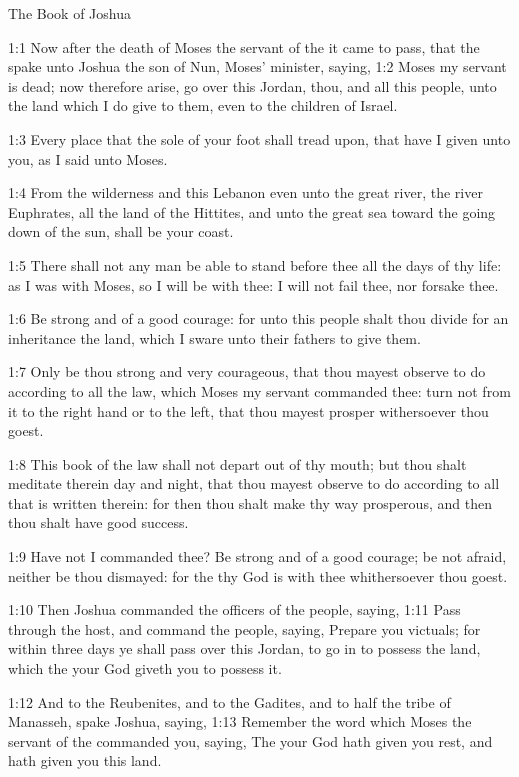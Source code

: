 The Book of Joshua


1:1 Now after the death of Moses the servant of the \LORD it came to pass, that the \LORD spake unto Joshua the son of Nun, Moses' minister, saying, 1:2 Moses my servant is dead; now therefore arise, go over this Jordan, thou, and all this people, unto the land which I do give to them, even to the children of Israel.

1:3 Every place that the sole of your foot shall tread upon, that have I given unto you, as I said unto Moses.

1:4 From the wilderness and this Lebanon even unto the great river, the river Euphrates, all the land of the Hittites, and unto the great sea toward the going down of the sun, shall be your coast.

1:5 There shall not any man be able to stand before thee all the days of thy life: as I was with Moses, so I will be with thee: I will not fail thee, nor forsake thee.

1:6 Be strong and of a good courage: for unto this people shalt thou divide for an inheritance the land, which I sware unto their fathers to give them.

1:7 Only be thou strong and very courageous, that thou mayest observe to do according to all the law, which Moses my servant commanded thee: turn not from it to the right hand or to the left, that thou mayest prosper withersoever thou goest.

1:8 This book of the law shall not depart out of thy mouth; but thou shalt meditate therein day and night, that thou mayest observe to do according to all that is written therein: for then thou shalt make thy way prosperous, and then thou shalt have good success.

1:9 Have not I commanded thee? Be strong and of a good courage; be not afraid, neither be thou dismayed: for the \LORD thy God is with thee whithersoever thou goest.

1:10 Then Joshua commanded the officers of the people, saying, 1:11 Pass through the host, and command the people, saying, Prepare you victuals; for within three days ye shall pass over this Jordan, to go in to possess the land, which the \LORD your God giveth you to possess it.

1:12 And to the Reubenites, and to the Gadites, and to half the tribe of Manasseh, spake Joshua, saying, 1:13 Remember the word which Moses the servant of the \LORD commanded you, saying, The \LORD your God hath given you rest, and hath given you this land.

